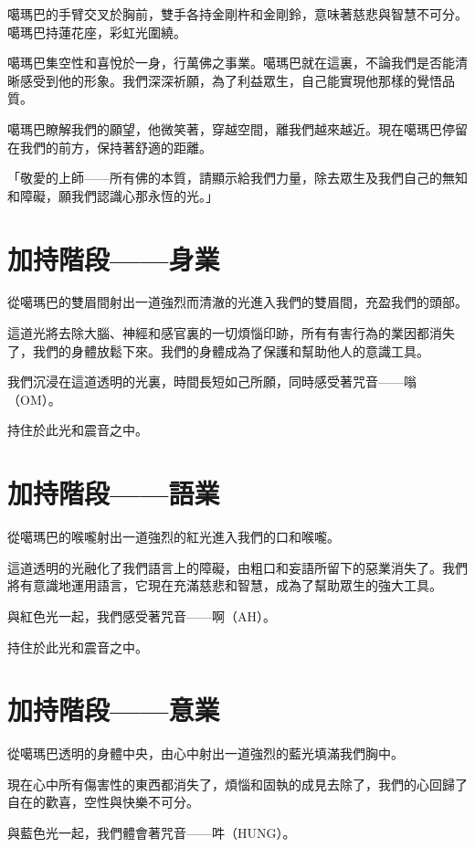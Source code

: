 \documentclass[a6paper,10pt]{ctexbook}
\let\footnote=\endnote
\newcommand{\remark}[1]{\vspace*{2pt} \textsf{#1}\vspace*{2pt}}
\begin{document}
噶瑪巴的手臂交叉於胸前，雙手各持金剛杵和金剛鈴，意味著慈悲與智慧不可分。噶瑪巴持蓮花座\footnote{結跏趺坐}，彩虹光圍繞。

噶瑪巴集空性和喜悅於一身，行萬佛之事業。噶瑪巴就在這裏，不論我們是否能清晰感受到他的形象。我們深深祈願，為了利益眾生，自己能實現他那樣的覺悟品質。

噶瑪巴瞭解我們的願望，他微笑著，穿越空間，離我們越來越近。現在噶瑪巴停留在我們的前方，保持著舒適的距離。

「敬愛的上師——所有佛的本質，請顯示給我們力量，除去眾生及我們自己的無知和障礙，願我們認識心那永恆的光。」

\setlength{\parskip}{3pt}

\section*{加持階段——身業}

從噶瑪巴的雙眉間射出一道強烈而清澈的光進入我們的雙眉間，充盈我們的頭部。

這道光將去除大腦、神經和感官裏的一切煩惱印跡，所有有害行為的業因都消失了，我們的身體放鬆下來。我們的身體成為了保護和幫助他人的意識工具。

我們沉浸在這道透明的光裏，時間長短如己所願，同時感受著咒音——嗡（OM）。

\remark{持住於此光和震音之中。}

\section*{加持階段——語業}

從噶瑪巴的喉嚨射出一道強烈的紅光進入我們的口和喉嚨。

這道透明的光融化了我們語言上的障礙，由粗口和妄語所留下的惡業消失了。我們將有意識地運用語言，它現在充滿慈悲和智慧，成為了幫助眾生的強大工具。

與紅色光一起，我們感受著咒音——啊（AH）。

\remark{持住於此光和震音之中。}

\section*{加持階段——意業}

從噶瑪巴透明的身體中央，由心中射出一道強烈的藍光填滿我們胸中。

現在心中所有傷害性的東西都消失了，煩惱和固執的成見去除了，我們的心回歸了自在的歡喜\footnote{無作意歡喜}，空性與快樂不可分。

與藍色光一起，我們體會著咒音——吽（HUNG）。
\end{document}
